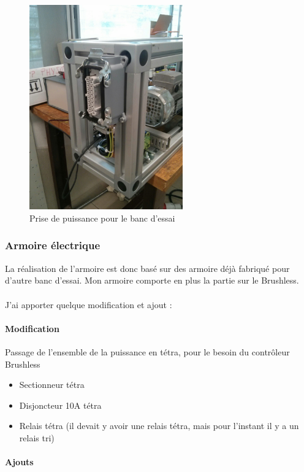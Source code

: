 \documentclass[11pt]{article}
\begin{document}
\begin{figure}[!h]
    \centering
    \includegraphics[width=250px]{IMG_20160628_173711.jpg}
    \caption{Prise de puissance pour le banc d'essai}
\end{figure}

\FloatBarrier

\subsubsection{Armoire électrique}
La réalisation de l'armoire est donc basé sur des armoire déjà fabriqué pour d'autre banc d'essai. Mon armoire comporte en plus la partie sur le Brushless.\\
\\
J'ai apporter quelque modification et ajout :

\paragraph{Modification \\}

Passage de l'ensemble de la puissance en tétra, pour le besoin du contrôleur Brushless
	\begin{itemize}
		\item Sectionneur tétra
		\item Disjoncteur 10A tétra
		\item Relais tétra (il devait y avoir une relais tétra, mais pour l'instant il y a un relais tri)
	\end{itemize}

\paragraph{Ajouts\\}
\end{document}
